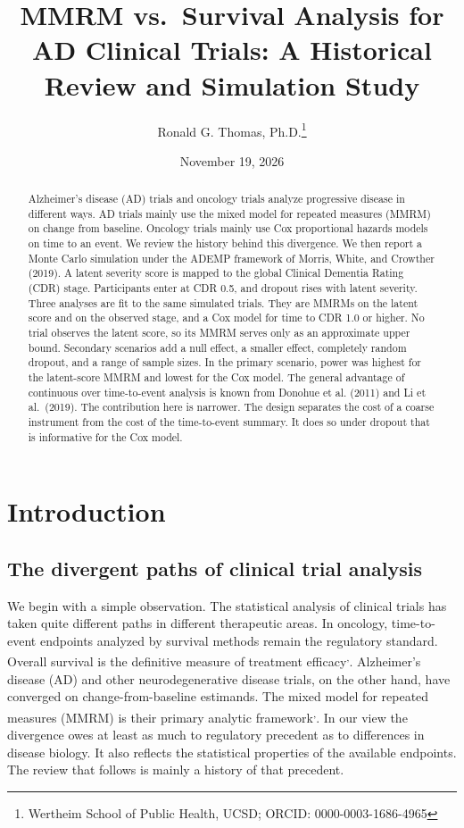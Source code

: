 \documentclass[
  11pt,
]{article}
\title{MMRM vs.~Survival Analysis for AD Clinical Trials: A Historical Review and Simulation Study}
\author{Ronald G. Thomas, Ph.D.\thanks{Wertheim School of Public Health, UCSD; ORCID: 0000-0003-1686-4965}}
\date{November 19, 2026}
\begin{document}
\maketitle
\begin{abstract}
Alzheimer's disease (AD) trials and oncology trials
analyze progressive disease in different ways. AD trials
mainly use the mixed model for repeated measures (MMRM)
on change from baseline. Oncology trials mainly use Cox
proportional hazards models on time to an event. We
review the history behind this divergence. We then
report a Monte Carlo simulation under the ADEMP
framework of Morris, White, and Crowther (2019). A
latent severity score is mapped to the global Clinical
Dementia Rating (CDR) stage. Participants enter at CDR
0.5, and dropout rises with latent severity. Three
analyses are fit to the same simulated trials. They are
MMRMs on the latent score and on the observed stage, and
a Cox model for time to CDR 1.0 or higher. No trial
observes the latent score, so its MMRM serves only as an
approximate upper bound. Secondary scenarios add a null
effect, a smaller effect, completely random dropout, and
a range of sample sizes. In the primary scenario, power
was highest for the latent-score MMRM and lowest for the
Cox model. The general advantage of continuous over
time-to-event analysis is known from Donohue et al.
(2011) and Li et al.~(2019). The contribution here is
narrower. The design separates the cost of a coarse
instrument from the cost of the time-to-event summary.
It does so under dropout that is informative for the Cox
model.
\end{abstract}

{
\setcounter{tocdepth}{2}
\tableofcontents
}
\section{Introduction}\label{introduction}

\subsection{The divergent paths of clinical trial analysis}\label{the-divergent-paths-of-clinical-trial-analysis}

We begin with a simple observation. The statistical
analysis of clinical trials has taken quite different
paths in different therapeutic areas. In oncology,
time-to-event endpoints analyzed by survival methods
remain the regulatory standard. Overall survival is the
definitive measure of treatment efficacy\textsuperscript{,}. Alzheimer's
disease (AD) and other neurodegenerative disease trials,
on the other hand, have converged on change-from-baseline
estimands. The mixed model for repeated measures (MMRM) is
their primary analytic framework\textsuperscript{,}. In our
view the divergence owes at least as much to regulatory
precedent as to differences in disease biology. It also
reflects the statistical properties of the available
endpoints. The review that follows is mainly a history of
that precedent.
\end{document}
